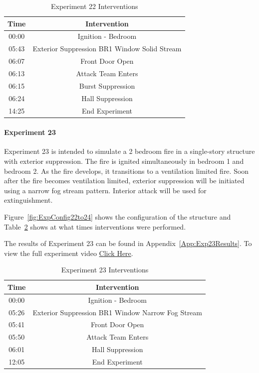 \documentclass[12pt,oneside]{book}
\begin{document}
\begin{table}[H]
	\centering
	\caption{Experiment 22 Interventions}
	\begin{tabular}{|c|c|} 
		\hline
		Time & Intervention \\ \hline \hline
		00:00 & Ignition - Bedroom \\ \hline
		05:43 & Exterior Suppression BR1 Window Solid Stream \\ \hline
		06:07 & Front Door Open \\ \hline
		06:13 & Attack Team Enters\\ \hline
		06:15 & Burst Suppression \\ \hline 
		06:24 & Hall Suppression \\ \hline
		14:25 & End Experiment\\ \hline
	\end{tabular}
	\label{Table:Exp22Interventions}
\end{table}

\clearpage

\paragraph{Experiment 23} \mbox{}

Experiment 23 is intended to simulate a 2 bedroom fire in a single-story structure with exterior suppression. The fire is ignited simultaneously in bedroom 1 and bedroom 2. As the fire develops, it transitions to a ventilation limited fire. Soon after the fire becomes ventilation limited, exterior suppression will be initiated using a narrow fog stream pattern. Interior attack will be used for extinguishment. 

Figure~\ref{fig:ExpConfig22to24} shows the configuration of the structure and Table~\ref{Table:Exp23Interventions} shows at what times interventions were performed. 

The results of Experiment 23 can be found in Appendix~\ref{App:Exp23Results}. To view the full experiment video \href{https://youtu.be/gl8rc1Nsl1k}{Click Here}.

\begin{table}[H]
	\centering
	\caption{Experiment 23 Interventions}
	\begin{tabular}{|c|c|} 
		\hline
		Time & Intervention \\ \hline \hline
		00:00 & Ignition - Bedroom \\ \hline
		05:26 & Exterior Suppression BR1 Window Narrow Fog Stream \\ \hline
		05:41 & Front Door Open \\ \hline
		05:50 & Attack Team Enters\\ \hline
		06:01 & Hall Suppression \\ \hline 
		12:05 & End Experiment\\ \hline
	\end{tabular}
	\label{Table:Exp23Interventions}
\end{table}
\end{document}
